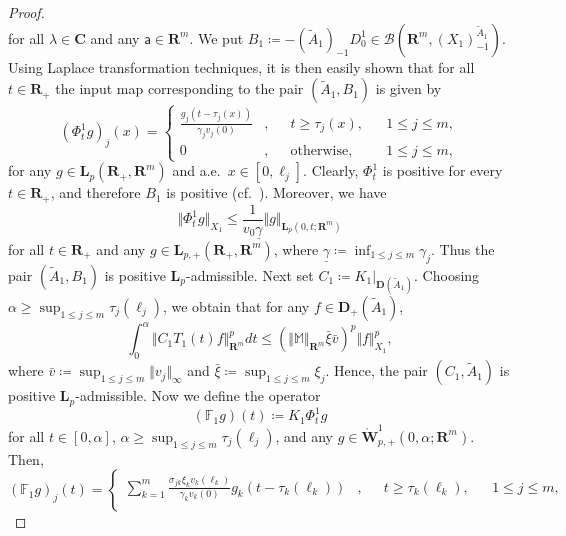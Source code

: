 \documentclass[a4paper,11pt,reqno]{amsart}
\def\la{\lambda}
\def\calB{{\calB}}
\def\calB{{\mathcal{B}}}
\def\R{\mathbf{R}}
\def\C{\mathbf{C}}
\theoremstyle{plain}
\numberwithin{equation}{section}
\begin{document}
\begin{proof}
\begin{equation*}
\end{equation*}
for all $\la\in \C$ and any $\mathsf{a}\in \R^m$. We put $B_1\coloneqq -(\tilde{A}_1)_{-1}D_0^1\in\calB(\R^m,(X_1)_{-1}^{\tilde{A}_1})$. Using Laplace transformation techniques, it is then easily shown that for all $t\in\R_+$ the input map corresponding to the pair $(\tilde{A}_1,B_1)$ is given by 
\begin{equation*}
(\Phi^{1}_t g)_j(x)=\left\{\begin{split}
\frac{g_j(t-\tau_j(x))}{\gamma_j v_j(0)}&,&& t\ge \tau_j(x),&& 1\le j\le m,\\
 0&,&&\text{otherwise},&& 1\le j\le m,
\end{split}\right.
\end{equation*}
for any $g\in {\bm L}_p(\R_+,\R^m)$ and a.e.\ $x\in [0,\ell_j]$. Clearly, $\Phi^{1}_t$ is positive for every $t\in\R_+$, and therefore $B_1$ is positive (cf.\ \cite[Lemma 2.2]{elgantouh2025admissibility}). Moreover, we have 
\begin{equation*}
\Vert \Phi^{1}_t g\Vert_{X_1}\le \frac{1}{v_0 \underline{\gamma}}\Vert g\Vert_{{\bm L}_p(0,t;\R^m)}
\end{equation*}
for all $t\in\R_+$ and any $g\in {\bm L}_{p,+}(\R_+,\R^m)$, where $\underline{\gamma}\coloneqq \inf_{1\le j\le m} \gamma_j$. Thus the pair $(\tilde{A}_1,B_1)$ is positive $\bm{L}_p$-admissible. Next set $C_1\coloneqq K_1\vert_{{\bm D}(\tilde{A}_1)}$. Choosing $\alpha\ge \sup_{1\le j\le m}\tau_j(\ell_j)$, we obtain that for any $f\in {\bm D}_+(\tilde{A}_1)$,
\begin{equation*}
\int_{0}^{\alpha} \Vert C_1 T_1(t)f\Vert^p_{\R^m} dt \le (\Vert\mathbb{M}\Vert_{\R^m}\bar{\xi}\bar{v})^p\Vert f\Vert_{X_1}^p,
\end{equation*}
where $\bar{v}\coloneqq \sup_{1\le j\le m}\Vert v_j\Vert_\infty$ and $\bar{\xi}\coloneqq \sup_{1\le j\le m} \xi_j$. Hence, the pair $(C_1,\tilde{A}_1)$ is positive $\bm{L}_p$-admissible. Now we define the operator
\begin{equation*}
(\mathbb{F}_1g)(t)\coloneqq K_1\Phi^{1}_tg
\end{equation*}
for all $t\in[0,\alpha]$, $\alpha\ge \sup_{1\le j\le m}\tau_j(\ell_j)$, and any $g\in \mathring{\bm{W}}^{1}_{p,+}(0,\alpha;\R^m)$. Then,
\begin{equation}\label{input-output-L}
(\mathbb{F}_1g)_j(t)= \left\{\begin{split}
\sum_{k=1}^{m} \frac{\sigma_{jk}\xi_kv_k(\ell_k)}{\gamma_k v_k(0)}g_{k}(t-\tau_{k}(\ell_{k}))&,&&t\ge \tau_k(\ell_k),&& 1\le j\le m,\\

\end{split}
\end{equation}
\end{proof}
\end{document}
